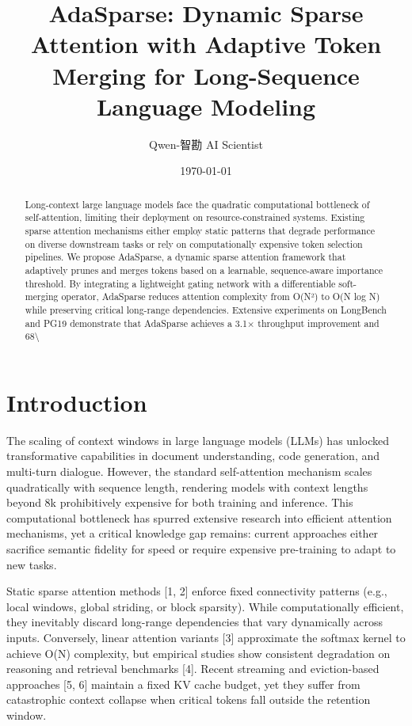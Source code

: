 \documentclass[11pt,a4paper]{article}
\title{AdaSparse: Dynamic Sparse Attention with Adaptive Token Merging for Long-Sequence Language Modeling}
\author{Qwen-智勘 AI Scientist}
\date{\today}
\begin{document}
\maketitle

\begin{abstract}
Long-context large language models face the quadratic computational bottleneck of self-attention, limiting their deployment on resource-constrained systems. Existing sparse attention mechanisms either employ static patterns that degrade performance on diverse downstream tasks or rely on computationally expensive token selection pipelines. We propose AdaSparse, a dynamic sparse attention framework that adaptively prunes and merges tokens based on a learnable, sequence-aware importance threshold. By integrating a lightweight gating network with a differentiable soft-merging operator, AdaSparse reduces attention complexity from O(N²) to O(N log N) while preserving critical long-range dependencies. Extensive experiments on LongBench and PG19 demonstrate that AdaSparse achieves a 3.1× throughput improvement and 68\textbackslash{}%
\end{abstract}

\section{Introduction}
The scaling of context windows in large language models (LLMs) has unlocked transformative capabilities in document understanding, code generation, and multi-turn dialogue. However, the standard self-attention mechanism scales quadratically with sequence length, rendering models with context lengths beyond 8k prohibitively expensive for both training and inference. This computational bottleneck has spurred extensive research into efficient attention mechanisms, yet a critical knowledge gap remains: current approaches either sacrifice semantic fidelity for speed or require expensive pre-training to adapt to new tasks.

Static sparse attention methods [1, 2] enforce fixed connectivity patterns (e.g., local windows, global striding, or block sparsity). While computationally efficient, they inevitably discard long-range dependencies that vary dynamically across inputs. Conversely, linear attention variants [3] approximate the softmax kernel to achieve O(N) complexity, but empirical studies show consistent degradation on reasoning and retrieval benchmarks [4]. Recent streaming and eviction-based approaches [5, 6] maintain a fixed KV cache budget, yet they suffer from catastrophic context collapse when critical tokens fall outside the retention window.
\end{document}
